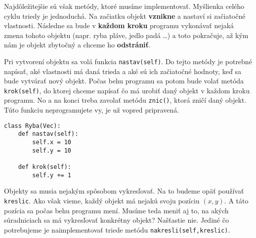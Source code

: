 Najdôležitejšie sú však metódy, ktoré musíme implementovať. Myšlienka celého cyklu triedy je
jednoduchá. Na začiatku objekt \textbf{vznikne} a nastaví si začiatočné vlastnosti. Následne sa bude
v \textbf{každom kroku} programu vykonávať nejaká zmena tohoto objektu (napr. ryba pláve, jedlo padá
\dots) a toto pokračuje, až kým nám je objekt zbytočný a chceme ho \textbf{odstrániť}.

Pri vytvorení objektu sa volá funkcia \texttt{nastav(self)}. Do tejto metódy je potrebné napísať, aké
vlastnosti má daná trieda a aké sú ich začiatočné hodnoty, keď sa bude vytvárať nový objekt. Počas
behu programu sa potom bude volať metóda \texttt{krok(self)}, do ktorej chceme napísať čo má urobiť daný
objekt v každom kroku programu. No a na konci treba zavolať metódu \texttt{znic()}, ktorá zničí daný
objekt. Túto funkciu neprogramujete vy, je už vopred pripravená.

\begin{lstlisting}
class Ryba(Vec):
    def nastav(self):
        self.x = 10
        self.y = 10
    
    def krok(self):
        self.y += 1
\end{lstlisting}


Objekty sa musia nejakým spôsobom vykresľovať. Na to budeme opäť používať \texttt{kreslic}. Ako však
vieme, každý objekt má nejakú svoju pozíciu $(x,y)$. A táto pozícia sa počas behu programu mení.
Musíme teda meniť aj to, na akých súradniciach sa má vykresľovať konkrétny objekt? Našťastie nie.
Jediné čo potrebujeme je naimplementovať triede metódu \texttt{nakresli(self,kreslic)}.



